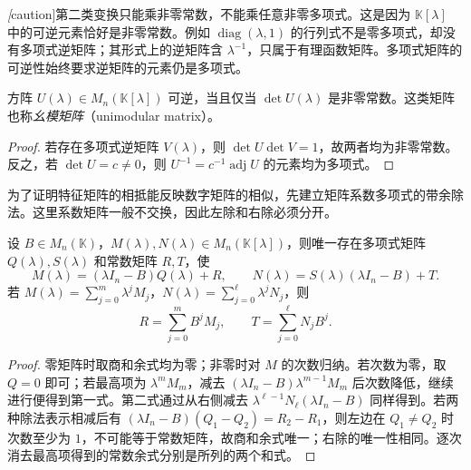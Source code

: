 \emph[caution]{第二类变换只能乘非零常数，不能乘任意非零多项式。}这是因为 $\mathbb K[\lambda]$ 中的可逆元素恰好是非零常数。例如 $\operatorname{diag}(\lambda,1)$ 的行列式不是零多项式，却没有多项式逆矩阵；其形式上的逆矩阵含 $\lambda^{-1}$，只属于有理函数矩阵。多项式矩阵的可逆性始终要求逆矩阵的元素仍是多项式。

\begin{proposition}
\label{prop:xie-unimodular-determinant}
方阵 $U(\lambda)\in M_n(\mathbb K[\lambda])$ 可逆，当且仅当 $\det U(\lambda)$ 是非零常数。这类矩阵也称\emph{幺模矩阵}（unimodular matrix）。
\end{proposition}
\begin{proof}
若存在多项式逆矩阵 $V(\lambda)$，则 $\det U\det V=1$，故两者均为非零常数。反之，若 $\det U=c\ne0$，则 $U^{-1}=c^{-1}\operatorname{adj}U$ 的元素均为多项式。
\end{proof}

为了证明特征矩阵的相抵能反映数字矩阵的相似，先建立矩阵系数多项式的带余除法。这里系数矩阵一般不交换，因此左除和右除必须分开。

\begin{lemma}
\label{lem:xie-matrix-polynomial-division}
设 $B\in M_n(\mathbb K)$，$M(\lambda),N(\lambda)\in M_n(\mathbb K[\lambda])$，则唯一存在多项式矩阵 $Q(\lambda),S(\lambda)$ 和常数矩阵 $R,T$，使
\begin{equation}
\label{eq:xie-matrix-polynomial-division}
    M(\lambda)=(\lambda I_n-B)Q(\lambda)+R,
    \qquad
    N(\lambda)=S(\lambda)(\lambda I_n-B)+T.
\end{equation}
若 $M(\lambda)=\sum_{j=0}^m\lambda^jM_j$，$N(\lambda)=\sum_{j=0}^{\ell}\lambda^jN_j$，则
\[
    R=\sum_{j=0}^m B^jM_j,
    \qquad T=\sum_{j=0}^{\ell}N_jB^j.
\]
\end{lemma}
\begin{proof}
零矩阵时取商和余式均为零；非零时对 $M$ 的次数归纳。若次数为零，取 $Q=0$ 即可；若最高项为 $\lambda^mM_m$，减去 $(\lambda I_n-B)\lambda^{m-1}M_m$ 后次数降低，继续进行便得到第一式。第二式通过从右侧减去 $\lambda^{\ell-1}N_\ell(\lambda I_n-B)$ 同样得到。若两种除法表示相减后有 $(\lambda I_n-B)(Q_1-Q_2)=R_2-R_1$，则左边在 $Q_1\ne Q_2$ 时次数至少为 $1$，不可能等于常数矩阵，故商和余式唯一；右除的唯一性相同。逐次消去最高项得到的常数余式分别是所列的两个和式。
\end{proof}

